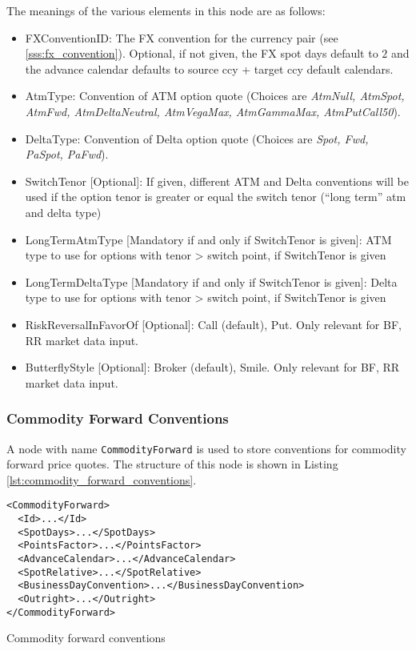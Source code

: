  
The meanings of the various elements in this node are as follows: 
\begin{itemize}
\item FXConventionID: The FX convention for the currency pair (see \ref{sss:fx_convention}). Optional, if not given, the
  FX spot days default to $2$ and the advance calendar defaults to source ccy + target ccy default calendars.
\item AtmType: Convention of ATM option quote (Choices are {\em AtmNull, AtmSpot, AtmFwd, 
AtmDeltaNeutral, AtmVegaMax, AtmGammaMax, AtmPutCall50}). 
\item DeltaType: Convention of Delta option quote (Choices are {\em Spot, Fwd, PaSpot, 
    PaFwd}).
\item SwitchTenor [Optional]: If given, different ATM and Delta conventions will be used if the option tenor is greater
  or equal the switch tenor (``long term'' atm and delta type)
\item LongTermAtmType [Mandatory if and only if SwitchTenor is given]: ATM type to use for options with tenor > switch
  point, if SwitchTenor is given
\item LongTermDeltaType [Mandatory if and only if SwitchTenor is given]: Delta type to use for options with tenor >
  switch point, if SwitchTenor is given
\item RiskReversalInFavorOf [Optional]: Call (default), Put. Only relevant for BF, RR market data input.
\item ButterflyStyle [Optional]: Broker (default), Smile. Only relevant for BF, RR market data input.
\end{itemize} 

\subsubsection{Commodity Forward Conventions}
A node with name \lstinline!CommodityForward! is used to store conventions for commodity forward price quotes. The
structure of this node is shown in Listing \ref{lst:commodity_forward_conventions}.

\begin{listing}[H]
\begin{verbatim}
<CommodityForward>
  <Id>...</Id>
  <SpotDays>...</SpotDays>
  <PointsFactor>...</PointsFactor>
  <AdvanceCalendar>...</AdvanceCalendar>
  <SpotRelative>...</SpotRelative>
  <BusinessDayConvention>...</BusinessDayConvention>
  <Outright>...</Outright>
</CommodityForward>
\end{verbatim}
\caption{Commodity forward conventions}
\label{lst:commodity_forward_conventions}
\end{listing}

